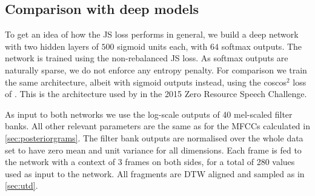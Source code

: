 \subsection{Comparison with deep models}
\label{sec:deep}
To get an idea of how the JS loss performs in general, we build a deep network with two hidden layers of $500$ sigmoid units each, with $64$ softmax outputs.
The network is trained using the non-rebalanced JS loss.
As softmax outputs are naturally sparse, we do not enforce any entropy penalty.
For comparison we train the same architecture, albeit with sigmoid outputs instead, using the coscos$^2$ loss of \textcite{synnaeve2014phonetics}.
This is the architecture used by \textcite{thiolliere2015hybrid} in the 2015 Zero Resource Speech Challenge.

As input to both networks we use the log-scale outputs of 40 mel-scaled filter banks.
All other relevant parameters are the same as for the MFCCs calculated in \cref{sec:posteriorgrams}.
The filter bank outputs are normalised over the whole data set to have zero mean and unit variance for all dimensions.
Each frame is fed to the network with a context of 3 frames on both sides, for a total of 280 values used as input to the network.
All fragments are DTW aligned and sampled as in \cref{sec:utd}.

